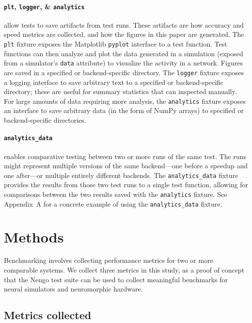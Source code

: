 \documentclass{frontiersSCNS}
\begin{document}
\paragraph{\texttt{plt}, \texttt{logger}, \& \texttt{analytics}}
allow tests to save artifacts from test runs.
These artifacts are how accuracy and speed metrics
are collected, and how the figures
in this paper are generated.
The \texttt{plt} fixture exposes the Matplotlib \citep{hunter2007}
\texttt{pyplot} interface to a test function.
Test functions can then analyze and plot
the data generated in a simulation
(exposed from a simulator's \texttt{data} attribute)
to visualize the activity in a network.
Figures are saved in a specified or backend-specific directory.
The \texttt{logger} fixture exposes a logging interface
to save arbitrary text to a specified
or backend-specific directory;
these are useful for summary statistics
that can inspected manually.
For large amounts of data
requiring more analysis,
the \texttt{analytics} fixture exposes an interface
to save arbitrary data (in the form of NumPy arrays)
to specified or backend-specific directories.

\paragraph{\texttt{analytics\_data}}
enables comparative testing between
two or more runs of the same test.
The runs might represent multiple versions
of the same backend---one before a
speedup and one after---or multiple
entirely different backends.
The \texttt{analytics\_data} fixture
provides the results from those two
test runs to a single test function,
allowing for comparisons
between the two results saved
with the \texttt{analytics} fixture.
See Appendix~A for a
concrete example of using the
\texttt{analytics\_data} fixture.

\section{Methods}

Benchmarking involves collecting performance metrics
for two or more comparable systems.
We collect three metrics in this study,
as a proof of concept that the Nengo test suite
can be used to collect meaningful benchmarks
for neural simulators and neuromorphic hardware.

\subsection{Metrics collected}
\label{Sec:Metrics}
\end{document}
